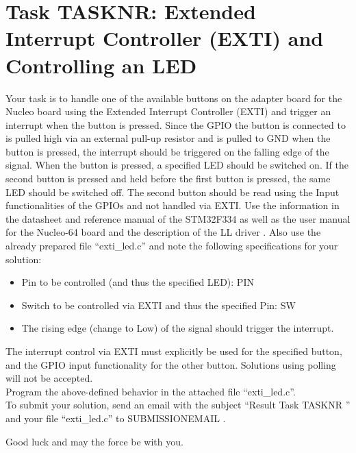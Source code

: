 \documentclass[a4paper,12pt]{article}
\begin{document}
\pagestyle{empty}
\setlength{\parindent}{0em}
\section*{Task {{TASKNR}}: Extended Interrupt Controller (EXTI) and Controlling an LED}

Your task is to handle one of the available buttons on the adapter board for the Nucleo board using the Extended Interrupt Controller (EXTI) and trigger an interrupt when the button is pressed. Since the GPIO the button is connected to is pulled high via an external pull-up resistor and is pulled to GND when the button is pressed, the interrupt should be triggered on the falling edge of the signal. When the button is pressed, a specified LED should be switched on. If the second button is pressed and held before the first button is pressed, the same LED should be switched off. The second button should be read using the Input functionalities of the GPIOs and not handled via EXTI. Use the information in the datasheet \cite{data_sheet} and reference manual \cite{ref_manual} of the STM32F334 as well as the user manual for the Nucleo-64 board \cite{nucleo_manual} and the description of the LL driver \cite{driver_manual}. Also use the already prepared file \enquote{exti\_led.c} and note the following specifications for your solution:

\begin{itemize}
\item Pin to be controlled (and thus the specified LED): {{PIN}}
\item Switch to be controlled via EXTI and thus the specified Pin: {{SW}}
\item The rising edge (change to Low) of the signal should trigger the interrupt.
\end{itemize}
\vspace{0.3cm}

The interrupt control via EXTI must explicitly be used for the specified button, and the GPIO input functionality for the other button. Solutions using polling will not be accepted.
\\

Program the above-defined behavior in the attached file \enquote{exti\_led.c}.
\\

To submit your solution, send an email with the subject \enquote{Result Task {{ TASKNR }}} and your file \enquote{exti\_led.c} to {{ SUBMISSIONEMAIL }}.

\vspace{0.7cm}

Good luck and may the force be with you.

\newpage
\printbibliography[heading=bibintoc]
\end{document}
